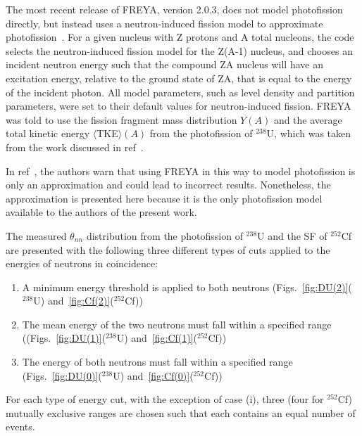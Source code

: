 The most recent release of FREYA, version 2.0.3, does not model photofission directly, but instead uses a neutron-induced fission model to approximate photofission~\cite{FREYA_photofission}.
For a given nucleus with Z protons and A total nucleons, the code selects the neutron-induced fission model for the Z(A-1) nucleus, and chooses an incident neutron energy such that the compound ZA nucleus will have an excitation energy, relative to the ground state of ZA, that is equal to the energy of the incident photon.
All model parameters, such as level density and partition parameters, were set to their default values for neutron-induced fission.
FREYA was told to use the fission fragment mass distribution $Y(A)$ and the average total kinetic energy $\langle$TKE$\rangle(A)$ from the photofission of $^{238}$U, which was taken from the work discussed in ref~\cite{2017Krishichayan}.

In ref~\cite{Talou2018}, the authors warn that using FREYA in this way to model photofission is only an approximation and could lead to incorrect results.
Nonetheless, the approximation is presented here because it is the only photofission model available to the authors of the present work.

The measured $\theta_{nn}$ distribution from the photofission of $^{238}$U and the SF of $^{252}$Cf are presented with the following three different types of cuts applied to the energies of neutrons in coincidence:
\begin{enumerate}[label=(\roman*), itemjoin={{, }}, itemjoin*={{, or }}]
    \item A minimum energy threshold is applied to both neutrons (Figs.~\ref{fig:DU(2)}($^{238}$U) and~\ref{fig:Cf(2)}($^{252}$Cf))
   \item The mean energy of the two neutrons must fall within a specified range ((Figs.~\ref{fig:DU(1)}($^{238}$U) and~\ref{fig:Cf(1)}($^{252}$Cf))
   \item The energy of both neutrons must fall within a specified range (Figs.~\ref{fig:DU(0)}($^{238}$U) and~\ref{fig:Cf(0)}($^{252}$Cf))
  \end{enumerate}
For each type of energy cut, with the exception of case (i), three (four for $^{252}$Cf) mutually exclusive ranges are chosen such that each contains an equal number of events.


